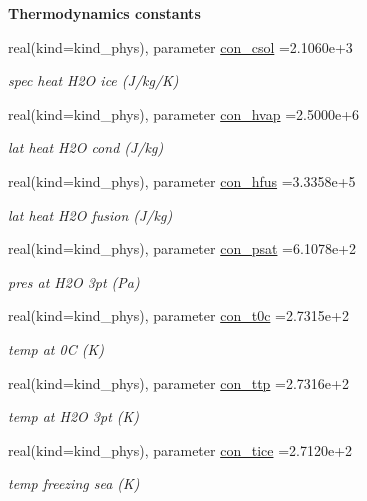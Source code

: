 \begin{Indent}{\bf Thermodynamics constants}
\begin{DoxyCompactItemize}
real(kind=kind\+\_\+phys), parameter \hyperlink{namespacephyscons_afad2954199233ac4d97f3f690e255836}{con\+\_\+csol} =2.\+1060e+3
\begin{DoxyCompactList}\small\item\em spec heat H2O ice (J/kg/K) \end{DoxyCompactList}\item 
real(kind=kind\+\_\+phys), parameter \hyperlink{namespacephyscons_a65ec8e424f61ccfe8520bf7cc5c070f8}{con\+\_\+hvap} =2.\+5000e+6
\begin{DoxyCompactList}\small\item\em lat heat H2O cond (J/kg) \end{DoxyCompactList}\item 
real(kind=kind\+\_\+phys), parameter \hyperlink{namespacephyscons_a6d9481f4395882116e2a26bc85a617a6}{con\+\_\+hfus} =3.\+3358e+5
\begin{DoxyCompactList}\small\item\em lat heat H2O fusion (J/kg) \end{DoxyCompactList}\item 
real(kind=kind\+\_\+phys), parameter \hyperlink{namespacephyscons_a86f12d814a25d633cd0c05b90cd84ec8}{con\+\_\+psat} =6.\+1078e+2
\begin{DoxyCompactList}\small\item\em pres at H2O 3pt (Pa) \end{DoxyCompactList}\item 
real(kind=kind\+\_\+phys), parameter \hyperlink{namespacephyscons_abdc3bd91e0599b1f58762612f02871e4}{con\+\_\+t0c} =2.\+7315e+2
\begin{DoxyCompactList}\small\item\em temp at 0C (K) \end{DoxyCompactList}\item 
real(kind=kind\+\_\+phys), parameter \hyperlink{namespacephyscons_aa50af91a0e1d09edce2d2e6c4d7afc86}{con\+\_\+ttp} =2.\+7316e+2
\begin{DoxyCompactList}\small\item\em temp at H2O 3pt (K) \end{DoxyCompactList}\item 
real(kind=kind\+\_\+phys), parameter \hyperlink{namespacephyscons_af292f4e2670e56c932f2e2a80e33ef9f}{con\+\_\+tice} =2.\+7120e+2
\begin{DoxyCompactList}\small\item\em temp freezing sea (K) \end{DoxyCompactList}\item 

\end{DoxyCompactItemize}
\end{Indent}
